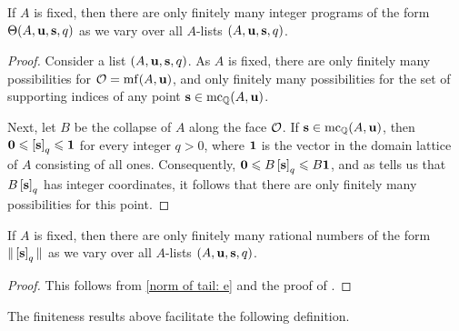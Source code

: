 \documentclass[11pt]{amsart}
\begin{document}

\begin{lemma} 
\label{finitely many secondary programs: L} 
If $A$ is fixed, then there are only finitely many integer programs of the form $\Theta(A, \mathbf{u}, \mathbf{s}, q)$ as we vary over all $A$-lists $(A, \mathbf{u}, \mathbf{s}, q)$.
\end{lemma}

\begin{proof}  Consider a list $(A, \mathbf{u}, \mathbf{s}, q)$.  As $A$ is fixed, there are only finitely many possibilities for $\mathcal{O} = \operatorname{mf}(A, \mathbf{u})$, and only finitely many possibilities for the set of supporting indices of any point $\mathbf{s} \in \operatorname{mc}_{\mathbb{Q}}(A ,\mathbf{u})$.  

Next, let $B$ be the collapse of $A$ along the face $\mathcal{O}$.  If $\mathbf{s} \in \operatorname{mc}_{\mathbb{Q}}(A, \mathbf{u})$, then $\mathbf{0} \leqslant \left[ \mathbf{s} \right]_q \leqslant \mathbf{1}$ for every integer $q > 0$, where $\mathbf{1}$ is the vector in the domain lattice of $A$ consisting of all ones.  Consequently, $\mathbf{0} \leqslant B \left[ \mathbf{s} \right]_q \leqslant B \mathbf{1}$, and as  tells us that $B \left[ \mathbf{s} \right]_q$ has integer coordinates, it follows that there are only finitely many possibilities for this point.
 \end{proof}

\begin{corollary} 
\label{finitely many coord sums: C}
 If $A$ is fixed, then there are only finitely many rational numbers of the form $ \| \left[ \mathbf{s} \right]_q \|$ as we vary over all $A$-lists $(A, \mathbf{u}, \mathbf{s}, q)$.  
\end{corollary}

\begin{proof}  This follows from \eqref{norm of tail: e} and the proof of .
\end{proof}


The finiteness results above facilitate the following definition.


\end{document}
